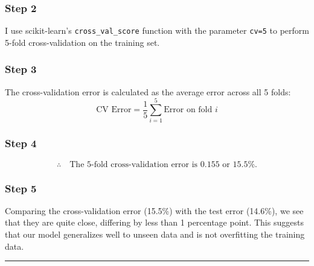 \documentclass{article}
\begin{document}
\subsubsection*{Step 2}
\parbox{\textwidth}{
I use scikit-learn's \texttt{cross\_val\_score} function with the parameter \texttt{cv=5} to perform 5-fold cross-validation on the training set.
}

\subsubsection*{Step 3}
\parbox{\textwidth}{
The cross-validation error is calculated as the average error across all 5 folds:
\[
\text{CV Error} = \frac{1}{5} \sum_{i=1}^{5} \text{Error on fold } i
\]
}

\subsubsection*{Step 4}
\parbox{\textwidth}{
\[
\therefore \quad \text{The 5-fold cross-validation error is } 0.155 \text{ or } 15.5\%.
\]
}

\subsubsection*{Step 5}
\parbox{\textwidth}{
Comparing the cross-validation error (15.5\%) with the test error (14.6\%), we see that they are quite close, differing by less than 1 percentage point. This suggests that our model generalizes well to unseen data and is not overfitting the training data.
}

\noindent\rule{\textwidth}{0.4pt}\\
\end{document}
